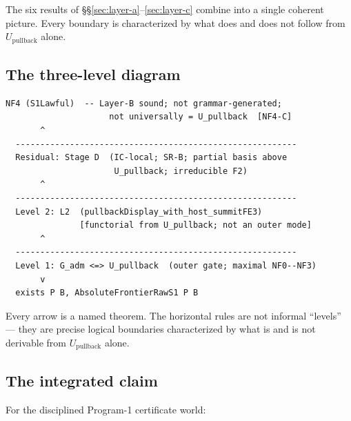 \documentclass[11pt]{article}
\theoremstyle{plain}
\theoremstyle{definition}
\newcommand{\Upb}{U_{\mathrm{pullback}}}
\begin{document}
The six results of \S\S\ref{sec:layer-a}--\ref{sec:layer-c} combine into a
single coherent picture.  Every boundary is characterized by what does and
does not follow from $\Upb$ alone.

\subsection{The three-level diagram}

\begin{center}
\begin{tcolorbox}[colback=gray!5, colframe=gray!40, width=0.88\linewidth,
  arc=3pt, boxrule=0.5pt]
\begin{Verbatim}[fontsize=\small]
  NF4 (S1Lawful)  -- Layer-B sound; not grammar-generated;
                     not universally = U_pullback  [NF4-C]
       ^
  ---------------------------------------------------------
  Residual: Stage D  (IC-local; SR-B; partial basis above
                      U_pullback; irreducible F2)
       ^
  ---------------------------------------------------------
  Level 2: L2  (pullbackDisplay_with_host_summitFE3)
               [functorial from U_pullback; not an outer mode]
       ^
  ---------------------------------------------------------
  Level 1: G_adm <=> U_pullback  (outer gate; maximal NF0--NF3)
       v
  exists P B, AbsoluteFrontierRawS1 P B
\end{Verbatim}
\end{tcolorbox}
\end{center}

\noindent
Every arrow is a named theorem.  The horizontal rules are not informal
``levels'' --- they are precise logical boundaries characterized by what is
and is not derivable from $\Upb$ alone.

\subsection{The integrated claim}

For the disciplined Program-1 certificate world:
\end{document}
